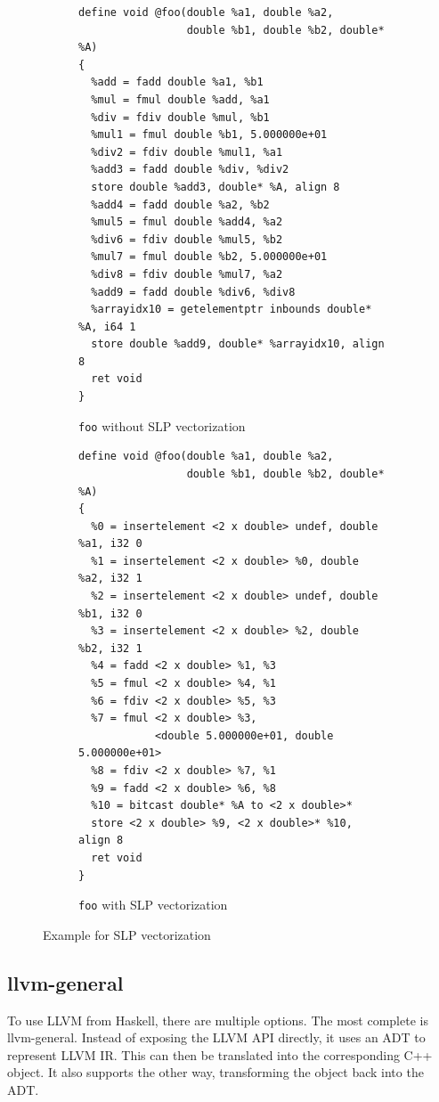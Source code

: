 \documentclass[a4paper,bibliography=totocnumbered,parskip,headsepline]{scrbook}
\begin{document}
\begin{figure}
\begin{subfigure}{\textwidth}
\begin{lstlisting}
define void @foo(double %a1, double %a2,
                 double %b1, double %b2, double* %A)
{
  %add = fadd double %a1, %b1
  %mul = fmul double %add, %a1
  %div = fdiv double %mul, %b1
  %mul1 = fmul double %b1, 5.000000e+01
  %div2 = fdiv double %mul1, %a1
  %add3 = fadd double %div, %div2
  store double %add3, double* %A, align 8
  %add4 = fadd double %a2, %b2
  %mul5 = fmul double %add4, %a2
  %div6 = fdiv double %mul5, %b2
  %mul7 = fmul double %b2, 5.000000e+01
  %div8 = fdiv double %mul7, %a2
  %add9 = fadd double %div6, %div8
  %arrayidx10 = getelementptr inbounds double* %A, i64 1
  store double %add9, double* %arrayidx10, align 8
  ret void
}
\end{lstlisting}
\caption{\lstinline{foo} without SLP vectorization}
\label{fig:slpll1}
\end{subfigure}

\begin{subfigure}{\textwidth}
\begin{lstlisting}
define void @foo(double %a1, double %a2,
                 double %b1, double %b2, double* %A)
{
  %0 = insertelement <2 x double> undef, double %a1, i32 0
  %1 = insertelement <2 x double> %0, double %a2, i32 1
  %2 = insertelement <2 x double> undef, double %b1, i32 0
  %3 = insertelement <2 x double> %2, double %b2, i32 1
  %4 = fadd <2 x double> %1, %3
  %5 = fmul <2 x double> %4, %1
  %6 = fdiv <2 x double> %5, %3
  %7 = fmul <2 x double> %3,
            <double 5.000000e+01, double 5.000000e+01>
  %8 = fdiv <2 x double> %7, %1
  %9 = fadd <2 x double> %6, %8
  %10 = bitcast double* %A to <2 x double>*
  store <2 x double> %9, <2 x double>* %10, align 8
  ret void
}
\end{lstlisting}
\caption{\lstinline{foo} with SLP vectorization}
\label{fig:slpll2}
\end{subfigure}
\caption{Example for SLP vectorization}
\label{fig:slpll}
\end{figure}

\subsection{llvm-general}
To use LLVM from Haskell, there are multiple options.
The most complete is llvm-general.\cite{scarlet2013llvm}
Instead of exposing the LLVM API directly, it uses an ADT to represent LLVM IR.
This can then be translated into the corresponding C++ object.
It also supports the other way, transforming the object back into the ADT.
\end{document}
